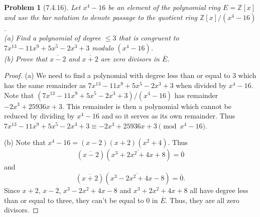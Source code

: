 \documentclass{article}
\newtheorem{problem}{Problem}
\begin{document}
\begin{problem}[7.4.16]
\label{polyrem}
Let $x^4 - 16$ be an element of the polynomial ring $E = \mathbb{Z}[x]$ and use the bar notation to denote passage to the quotient ring $\mathbb{Z}[x]/(x^4 - 16)$.\\
(a) Find a polynomial of degree $\leq 3$ that is congruent to $7x^{13} - 11x^9 + 5x^5 - 2x^3 + 3$ modulo $(x^4 - 16)$.\\
(b) Prove that $\overline{x - 2}$ and $\overline{x + 2}$ are zero divisors in $\overline{E}$.
\end{problem}
\begin{proof}
(a) We need to find a polynomial with degree less than or equal to $3$ which has the same remainder as $7x^{13} - 11x^9 + 5x^5 - 2x^3 + 3$ when divided by $x^4 - 16$. Note that $(7x^{13} - 11x^9 + 5x^5 - 2x^3 + 3)/(x^4 - 16)$ has remainder $-2x^3 + 25936x + 3$. This remainder is then a polynomial which cannot be reduced by dividing by $x^4 - 16$ and so it serves as its own remainder. Thus $7x^{13} - 11x^9 + 5x^5 - 2x^3 + 3 \equiv -2x^3 + 25936x + 3 \pmod{x^4 - 16}$.

(b) Note that $x^4 - 16 = (x-2)(x+2)(x^2 + 4)$. Thus
\[
(\overline{x-2})(\overline{x^3 + 2x^2 + 4x + 8}) = \overline{0}
\]
and
\[
(\overline{x+2})(\overline{x^3 - 2x^2 + 4x - 8}) = \overline{0}.
\]
Since $x+2$, $x-2$, $x^3 - 2x^2 + 4x - 8$ and $x^3 + 2x^2 + 4x + 8$ all have degree less than or equal to three, they can't be equal to $0$ in $\overline{E}$. Thus, they are all zero divisors.
\end{proof}
\end{document}
